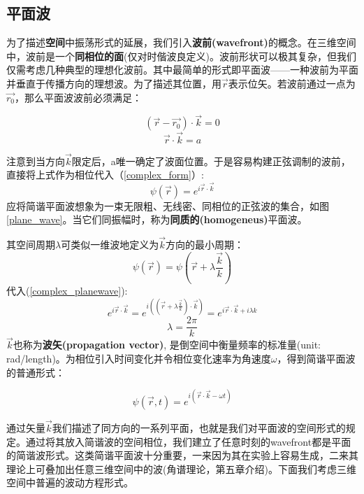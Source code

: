 \documentclass[12pt]{ctexart}%
\begin{document}
\subsection*{平面波}
为了描述\textbf{空间}中振荡形式的延展，我们引入\textbf{波前(wavefront)}的概念。在三维空间中，波前是一个\textbf{同相位的面}(仅对时偕波良定义)。波前形状可以极其复杂，但我们仅需考虑几种典型的理想化波前。其中最简单的形式即平面波——一种波前为平面并垂直于传播方向的理想波。为了描述其位置，用$\vec{r}$表示位矢。若波前通过一点为$\vec{r_0}$，那么平面波波前必须满足：

\begin{equation}
    (\vec{r}-\vec{r_0})\cdot\vec{k}=0
\end{equation}
\begin{equation}
    \vec{r}\cdot\vec{k}=a
\end{equation}

\par 注意到当方向$\vec{k}$限定后，a唯一确定了波面位置。于是容易构建正弦调制的波前，直接将上式作为相位代入（\ref{complex_form}）:
\begin{equation}
    \psi(\vec{r})=e^{i\vec{r}\cdot\vec{k}}
    \label{complex_planewave}
\end{equation}
应将简谐平面波想象为一束无限粗、无线密、同相位的正弦波的集合，如图\ref{plane_wave}。当它们同振幅时，称为\textbf{同质的(homogeneus)}平面波。

其空间周期$\lambda$可类似一维波地定义为$\vec{k}$方向的最小周期：
\begin{equation}
    \psi(\vec{r})=\psi(\vec{r}+\lambda \frac{\vec{k}}{k})
\end{equation}
代入(\ref{complex_planewave}):
\begin{equation}
    e^{i\vec{r}\cdot\vec{k}}=e^{i((\vec{r}+\lambda \frac{\vec{k}}{k})\cdot\vec{k})}=e^{i\vec{r}\cdot\vec{k}+i\lambda k}
\end{equation}
\begin{equation}
    \lambda=\frac{2\pi}{k}
\end{equation}
$\vec{k}$也称为\textbf{波矢(propagation vector)}, 是倒空间中衡量频率的标准量(unit: rad/length)。为相位引入时间变化并令相位变化速率为角速度$\omega$，得到简谐平面波的普通形式：
\begin{framed}
    \begin{equation}
        \psi(\vec{r},t)=e^{i(\vec{r}\cdot\vec{k}-\omega t)}
        \label{complex_planewave_2}
    \end{equation}
\end{framed}
\par 通过矢量$\vec{k}$我们描述了同方向的一系列平面，也就是我们对平面波的空间形式的规定。通过将其放入简谐波的空间相位，我们建立了任意时刻的wavefront都是平面的简谐波形式。这类简谐平面波十分重要，一来因为其在实验上容易生成，二来其理论上可叠加出任意三维空间中的波(角谱理论，第五章介绍)。下面我们考虑三维空间中普遍的波动方程形式。
\end{document}
